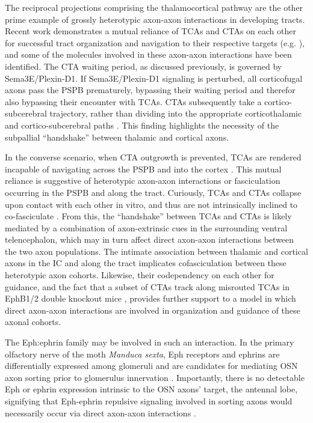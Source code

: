 The reciprocal projections comprising the thalamocortical pathway are the other prime example of grossly heterotypic axon-axon interactions in developing tracts.
Recent work demonstrates a mutual reliance of TCAs and CTAs on each other for successful tract organization and navigation to their respective targets (e.g. \cite{chen2012evidence,deck2013pathfinding}), and some of the molecules involved in these axon-axon interactions have been identified.
The CTA waiting period, as discussed previously, is governed by Sema3E/Plexin-D1.
If Sema3E/Plexin-D1 signaling is perturbed, all corticofugal axons pass the PSPB prematurely, bypassing their waiting period and therefor also bypassing their encounter with TCAs.
CTAs subsequently take a cortico-subcerebral trajectory, rather than dividing into the appropriate corticothalamic and cortico-subcerebral paths \cite{deck2013pathfinding}.
This finding highlights the necessity of the subpallial “handshake” between thalamic and cortical axons.

In the converse scenario, when CTA outgrowth is prevented, TCAs are rendered incapable of navigating across the PSPB and into the cortex \cite{chen2012evidence}.
This mutual reliance is suggestive of heterotypic axon-axon interactions or fasciculation occurring in the PSPB and along the tract.
Curiously, TCAs and CTAs collapse upon contact with each other in vitro, and thus are not intrinsically inclined to co-fasciculate \cite{bagnard2001axonal}.
From this, the “handshake” between TCAs and CTAs is likely mediated by a combination of axon-extrinsic cues in the surrounding ventral telencephalon, which may in turn affect direct axon-axon interactions between the two axon populations.
The intimate association between thalamic and cortical axons in the IC and along the tract \cite{molnar1998mechanisms} implicates cofasciculation between these heterotypic axon cohorts.
Likewise, their codependency on each other for guidance, and the fact that a subset of CTAs track along misrouted TCAs in EphB1/2 double knockout mice \cite{robichaux2014ephb}, provides further support to a model in which direct axon-axon interactions are involved in organization and guidance of these axonal cohorts.

The Eph:ephrin family may be involved in such an interaction.
In the primary olfactory nerve of the moth \emph{Manduca sexta}, Eph receptors and ephrins are differentially expressed among glomeruli and are candidates for mediating OSN axon sorting prior to glomerulus innervation \cite{kaneko2003interaxonal}.
Importantly, there is no detectable Eph or ephrin expression intrinsic to the OSN axons’ target, the antennal lobe, signifying that Eph-ephrin repulsive signaling involved in sorting axons would necessarily occur via direct axon-axon interactions \cite{kaneko2003interaxonal}.


